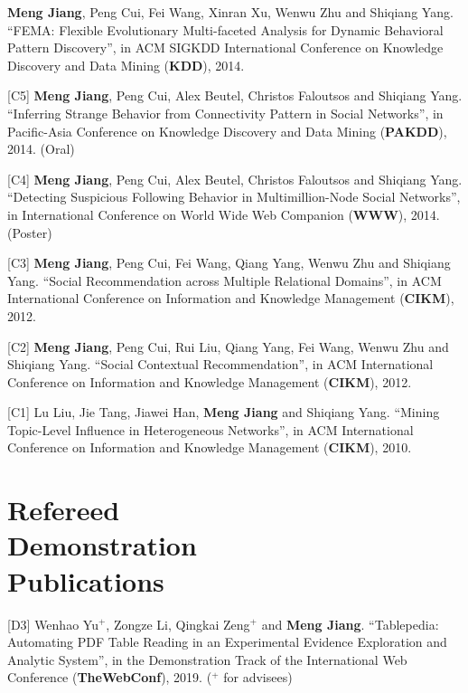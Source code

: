 \documentclass[margin, 9pt]{res}
\begin{document}
\begin{resume}
[C6] \textbf{Meng Jiang}, Peng Cui, Fei Wang, Xinran Xu, Wenwu Zhu and Shiqiang Yang. ``FEMA: Flexible Evolutionary Multi-faceted Analysis for Dynamic Behavioral Pattern Discovery'', in ACM SIGKDD International Conference on Knowledge Discovery and Data Mining (\textbf{KDD}), 2014.

[C5] \textbf{Meng Jiang}, Peng Cui, Alex Beutel, Christos Faloutsos and Shiqiang Yang. ``Inferring Strange Behavior from Connectivity Pattern in Social Networks'', in Pacific-Asia Conference on Knowledge Discovery and Data Mining (\textbf{PAKDD}), 2014. (Oral)

[C4] \textbf{Meng Jiang}, Peng Cui, Alex Beutel, Christos Faloutsos and Shiqiang Yang. ``Detecting Suspicious Following Behavior in Multimillion-Node Social Networks'', in International Conference on World Wide Web Companion (\textbf{WWW}), 2014. (Poster)

[C3] \textbf{Meng Jiang}, Peng Cui, Fei Wang, Qiang Yang, Wenwu Zhu and Shiqiang Yang. ``Social Recommendation across Multiple Relational Domains'', in ACM International Conference on Information and Knowledge Management (\textbf{CIKM}), 2012.

[C2] \textbf{Meng Jiang}, Peng Cui, Rui Liu, Qiang Yang, Fei Wang, Wenwu Zhu and Shiqiang Yang. ``Social Contextual Recommendation'', in ACM International Conference on Information and Knowledge Management (\textbf{CIKM}), 2012.

[C1] Lu Liu, Jie Tang, Jiawei Han, \textbf{Meng Jiang} and Shiqiang Yang. ``Mining Topic-Level Influence in Heterogeneous Networks'', in ACM International Conference on Information and Knowledge Management (\textbf{CIKM}), 2010.


\section{Refereed \\ Demonstration \\ Publications }

[D3] Wenhao Yu${}^{+}$, Zongze Li, Qingkai Zeng${}^{+}$ and \textbf{Meng Jiang}. ``Tablepedia: Automating PDF Table Reading in an Experimental Evidence Exploration and Analytic System'', in the Demonstration Track of the International Web Conference (\textbf{TheWebConf}), 2019. (${}^{+}$ for advisees)



\end{resume}
\end{document}
